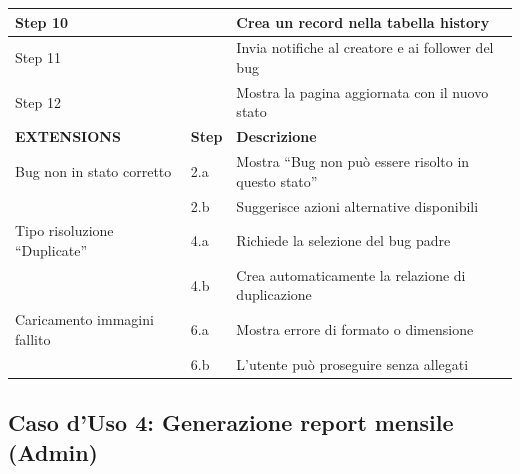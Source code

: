 \begin{longtable}{|p{3cm}|p{7cm}|p{5.5cm}|}
\hline
Step 10 & & Crea un record nella tabella history \\
\hline
Step 11 & & Invia notifiche al creatore e ai follower del bug \\
\hline
Step 12 & & Mostra la pagina aggiornata con il nuovo stato \\
\hline\hline
\textbf{EXTENSIONS} & \textbf{Step} & \textbf{Descrizione} \\
\hline
Bug non in stato corretto & 2.a & Mostra ``Bug non può essere risolto in questo stato'' \\
\hline
 & 2.b & Suggerisce azioni alternative disponibili \\
\hline
Tipo risoluzione ``Duplicate'' & 4.a & Richiede la selezione del bug padre \\
\hline
 & 4.b & Crea automaticamente la relazione di duplicazione \\
\hline
Caricamento immagini fallito & 6.a & Mostra errore di formato o dimensione \\
\hline
 & 6.b & L'utente può proseguire senza allegati \\
\hline
\end{longtable}

\subsection{Caso d'Uso 4: Generazione report mensile (Admin)}

